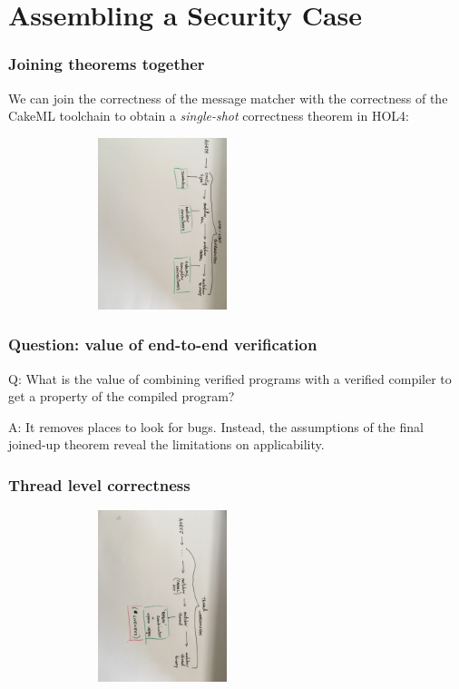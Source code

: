 \documentclass{beamer}
\begin{document}
\section {Assembling a Security Case}

\begin{frame}\frametitle{Joining theorems together}

  We can join the correctness of the message matcher with the
  correctness of the CakeML toolchain to obtain a \emph{single-shot} correctness theorem in HOL4:

  \includegraphics[width=90mm,height=50mm]{one-shot.jpg}

\end{frame}

\begin{frame}\frametitle{Question: value of end-to-end verification}

Q: What is the value of combining verified programs with a verified
   compiler to get a property of the compiled program?

A: It removes places to look for bugs. Instead, the assumptions of
the final joined-up theorem reveal the limitations on applicability.

\end{frame}


\begin{frame}\frametitle{Thread level correctness}

  \includegraphics[width=90mm,height=50mm]{thread.jpg}

\end{frame}
\end{document}
